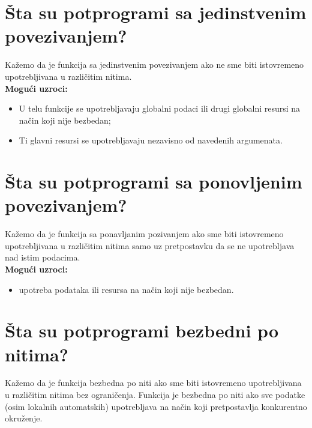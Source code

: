 \documentclass[a4paper]{article}
\begin{document}
\section{Šta su potprogrami sa jedinstvenim povezivanjem?}
  Kažemo da je funkcija sa jedinstvenim povezivanjem ako ne sme biti istovremeno upotrebljivana u 
  različitim nitima.\\
  \textbf{Mogući uzroci:}
    \begin{itemize}
      \item U telu funkcije se upotrebljavaju globalni podaci 
            ili drugi globalni resursi na način koji nije bezbedan;
      \item Ti glavni resursi se upotrebljavaju nezavisno od navedenih argumenata.
    \end{itemize}
\section{Šta su potprogrami sa ponovljenim povezivanjem?}
  Kažemo da je funkcija sa ponavljanim pozivanjem ako sme biti istovremeno upotrebljivana u 
  različitim nitima samo uz pretpostavku da se ne upotrebljava nad istim podacima.\\
  \textbf{Mogući uzroci:}
  \begin{itemize}
    \item upotreba podataka ili resursa na način koji nije bezbedan.
  \end{itemize}
 
\section{Šta su potprogrami bezbedni po nitima?}
  Kažemo da je funkcija bezbedna po niti ako sme biti istovremeno upotrebljivana u 
  različitim nitima bez ograničenja. Funkcija je bezbedna po niti ako sve podatke 
  (osim lokalnih automatskih) upotrebljava na način koji pretpostavlja konkurentno okruženje.
  
\end{document}
